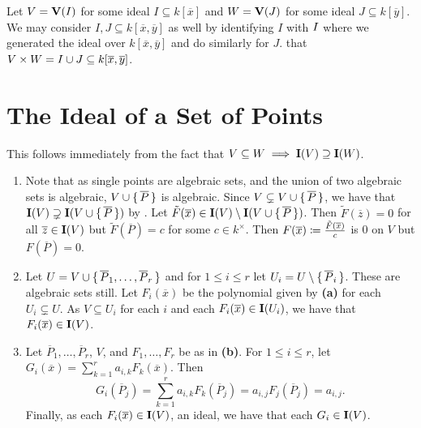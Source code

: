 \documentclass[letterpaper, 11pt, oneside]{book}
\begin{document}
\begin{sol}\label{ex:Curves_1.14}
\end{sol}

\begin{sol}\label{ex:Curves_1.15}
  Let $V = \operatorname{\mathbf{V}}(I)$ for some ideal $I \subseteq k[\overline{x}]$ and $W = \operatorname{\mathbf{V}}(J)$ for some ideal $J \subseteq k[\overline{y}]$.
  We may consider $I, J \subseteq k[\overline{x}, \overline{y}]$ as well by identifying $I$ with $\ideal{I}$ where we generated the ideal over $k[\overline{x}, \overline{y}]$ and do similarly for $J$.
   that $V \times W = \ideal{I \cup J} \subseteq k[\overline{x}, \overline{y}]$.
\end{sol}

\section{The Ideal of a Set of Points}

\begin{sol}\label{ex:Curves_1.16}
  This follows immediately from the fact that $V \subseteq W \implies \operatorname{\mathbf{I}}(V) \supseteq \operatorname{\mathbf{I}}(W)$.
\end{sol}

\begin{sol}\label{ex:Curves_1.17}
  \begin{enumerate}[label= (\alph*)]
    \item Note that as single points are algebraic sets, and the union of two algebraic sets is algebraic, $V \cup \set{\overline{P}}$ is algebraic.
          Since $V \subsetneq V \cup \set{\overline{P}}$, we have that $\operatorname{\mathbf{I}}(V) \supsetneq \operatorname{\mathbf{I}}(V \cup \set{\overline{P}})$ by .
          Let $\tilde{F}(\overline{x}) \in \operatorname{\mathbf{I}}(V) \setminus \operatorname{\mathbf{I}}(V \cup \set{\overline{P}})$.
          Then $\tilde{F}(\overline{z}) = 0$ for all $\overline{z} \in \operatorname{\mathbf{I}}(V)$ but $\tilde{F}(\overline{P}) = c$ for some $c \in k^{\times}$.
          Then $F(\overline{x}) \coloneqq \frac{\tilde{F}(\overline{x})}{c}$ is $0$ on $V$ but $F(\overline{P}) = 0$.
    \item Let $U = V \cup \set{\overline{P}_{1}, \ldots, \overline{P}_{r}}$ and for $1 \leq i \leq r$ let $U_{i} = U \setminus \set{\overline{P}_{i}}$.
          These are algebraic sets still.
          Let $F_{i}(\overline{x})$ be the polynomial given by \textbf{(a)} for each $U_{i} \subsetneq U$.
          As $V \subseteq U_{i}$ for each $i$ and each $F_{i}(\overline{x}) \in \operatorname{\mathbf{I}}(U_{i})$, we have that $F_{i}(\overline{x}) \in \operatorname{\mathbf{I}}(V)$.
    \item Let $\overline{P}_{1}, \ldots, \overline{P}_{r}$, $V$, and $F_{1}, \ldots, F_{r}$ be as in \textbf{(b)}.
          For $1 \leq i \leq r$, let $G_{i}(\overline{x}) = \sum_{k = 1}^{r} a_{i, k} F_{k}(\overline{x})$.
          Then
          \[
            G_{i}(\overline{P}_{j}) = \sum_{k = 1}^{r} a_{i, k} F_{k}(\overline{P}_{j}) = a_{i, j}F_{j}(\overline{P}_{j}) = a_{i, j}.
          \]
          Finally, as each $F_{i}(\overline{x}) \in \operatorname{\mathbf{I}}(V)$, an ideal, we have that each $G_{i} \in \operatorname{\mathbf{I}}(V)$.
  \end{enumerate}
\end{sol}
\end{document}
